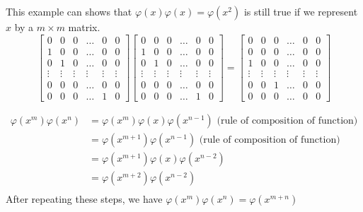 \begin{example}{}
This example can shows that $\varphi(x)\varphi(x) = \varphi(x^2)$ is still true if we represent $x$ by a $m\times m$ matrix.
\[\left[\begin{array}{cccccc}0 & 0 & 0 & \hdots & 0 & 0\\1 & 0 & 0 & \hdots & 0 & 0\\0 & 1 & 0 & \hdots & 0 & 0\\\vdots & \vdots & \vdots & \vdots & \vdots & \vdots\\0 & 0 & 0 & \hdots & 0 & 0\\0 & 0 & 0 & \hdots & 1 & 0\end{array}\right]\left[\begin{array}{cccccc}0 & 0 & 0 & \hdots & 0 & 0\\1 & 0 & 0 & \hdots & 0 & 0\\0 & 1 & 0 & \hdots & 0 & 0\\\vdots & \vdots & \vdots & \vdots & \vdots & \vdots\\0 & 0 & 0 & \hdots & 0 & 0\\0 & 0 & 0 & \hdots & 1 & 0\end{array}\right]=\left[\begin{array}{cccccc}0 & 0 & 0 & \hdots & 0 & 0\\0 & 0 & 0 & \hdots & 0 & 0\\1 & 0 & 0 & \hdots & 0 & 0\\\vdots & \vdots & \vdots & \vdots & \vdots & \vdots\\0 & 0 & 1 & \hdots & 0 & 0\\0 & 0 & 0 & \hdots & 0 & 0\end{array}\right]\]
\end{example}

\begin{example}{}
\begin{align*}
\varphi(x^m)\varphi(x^n) &= \varphi(x^m)\varphi(x)\varphi(x^{n-1})\text{ (rule of composition of function)}\\
&= \varphi(x^{m+1})\varphi(x^{n-1})\text{ (rule of composition of function)}\\
&= \varphi(x^{m+1})\varphi(x)\varphi(x^{n-2})\\
&= \varphi(x^{m+2})\varphi(x^{n-2})\\
\end{align*}
After repeating these steps, we have $\varphi(x^m)\varphi(x^n) = \varphi(x^{m+n})$
\end{example}

